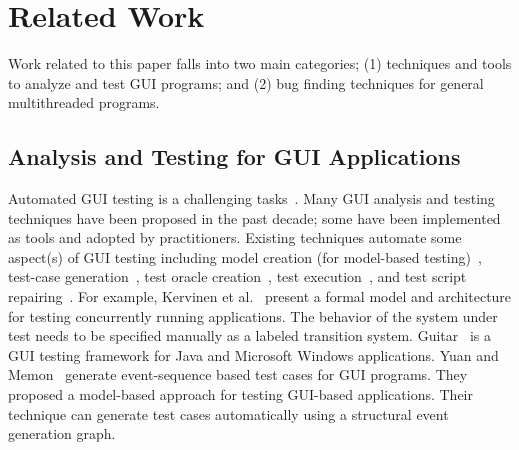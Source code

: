 \section{Related Work}

Work related to this paper falls into two main categories; (1)
techniques and tools to analyze and test GUI programs; and (2)
bug finding techniques for general multithreaded programs.

\subsection{Analysis and Testing for GUI Applications}

Automated GUI testing is a challenging tasks~\cite{Bertolino:2007:STR:1253532.1254712,
Harrold:2000:TR:336512.336532}.
 Many GUI analysis and testing techniques have been proposed in the past decade; some have been
implemented as tools and adopted by practitioners. Existing techniques automate
some aspect(s) of GUI testing including model creation
(for model-based testing)~\cite{androidtesting, Xie:2006:MTC:1172962.1172990},
test-case generation~\cite{YuanCohenMemonTSE2011, YuanMemonICSE2007},
test oracle creation~\cite{MemonFSE2000}, test execution~\cite{MemonFSE2001},
and test script repairing~\cite{Huang:2010:RGT:1828417.1828465, Daniel:2011:AGR:2002931.2002937}.
For example,
Kervinen et al.~\cite{Kervinen06model-basedtesting} present a formal model and architecture for testing
concurrently running applications. The behavior of the system under test
needs to be specified manually as a labeled transition system. 
Guitar~\cite{YuanCohenMemonTSE2011, YuanMemonICSE2007, Xie:2006:MTC:1172962.1172990}
is a GUI testing framework for Java and Microsoft Windows applications. 
Yuan and Memon~\cite{YuanMemonICSE2007} generate event-sequence based test cases for GUI
programs. They proposed a model-based approach for testing GUI-based applications.
Their technique can generate test cases automatically using a structural event
generation graph. 


